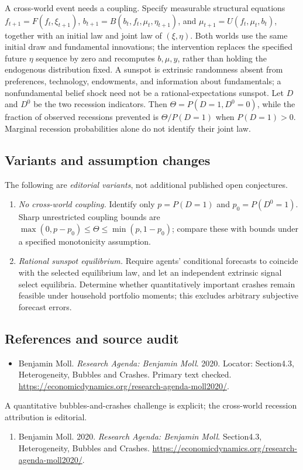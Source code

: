 \documentclass[11pt,a4paper]{article}
\begin{document}
A cross-world event needs a coupling. Specify measurable structural equations \(f_{t+1}=F(f_t,\xi_{t+1})\), \(b_{t+1}=B(b_t,f_t,\mu_t,\eta_{t+1})\), and \(\mu_{t+1}=U(f_t,\mu_t,b_t)\), together with an initial law and joint law of \((\xi,\eta)\). Both worlds use the same initial draw and fundamental innovations; the intervention replaces the specified future \(\eta\) sequence by zero and recomputes \(b,\mu,y\), rather than holding the endogenous distribution fixed. A sunspot is extrinsic randomness absent from preferences, technology, endowments, and information about fundamentals; a nonfundamental belief shock need not be a rational-expectations sunspot. Let \(D\) and \(D^0\) be the two recession indicators. Then \(\Theta=P(D=1,D^0=0)\), while the fraction of observed recessions prevented is \(\Theta/P(D=1)\) when \(P(D=1)>0\). Marginal recession probabilities alone do not identify their joint law.
\subsection*{Variants and assumption changes}
The following are \emph{editorial variants}, not additional published open conjectures.
\begin{enumerate}
\item \emph{No cross-world coupling.} Identify only \(p=P(D=1)\) and \(p_0=P(D^0=1)\). Sharp unrestricted coupling bounds are \(\max(0,p-p_0)\le\Theta\le\min(p,1-p_0)\); compare these with bounds under a specified monotonicity assumption.
\item \emph{Rational sunspot equilibrium.} Require agents' conditional forecasts to coincide with the selected equilibrium law, and let an independent extrinsic signal select equilibria. Determine whether quantitatively important crashes remain feasible under household portfolio moments; this excludes arbitrary subjective forecast errors.
\end{enumerate}
\subsection*{References and source audit}
\begin{itemize}
\item Benjamin Moll. \emph{Research Agenda: Benjamin Moll}. 2020. Locator: Section4.3, Heterogeneity, Bubbles and Crashes. Primary text checked. \url{https://economicdynamics.org/research-agenda-moll2020/}.
\end{itemize}
A quantitative bubbles-and-crashes challenge is explicit; the cross-world recession attribution is editorial.
\begin{enumerate}\raggedright
\item\hypertarget{definitions:source:30007516:1}{} Benjamin Moll. 2020. \emph{Research Agenda: Benjamin Moll}. Section4.3, Heterogeneity, Bubbles and Crashes.
\url{https://economicdynamics.org/research-agenda-moll2020/}.
\end{enumerate}
\end{document}
